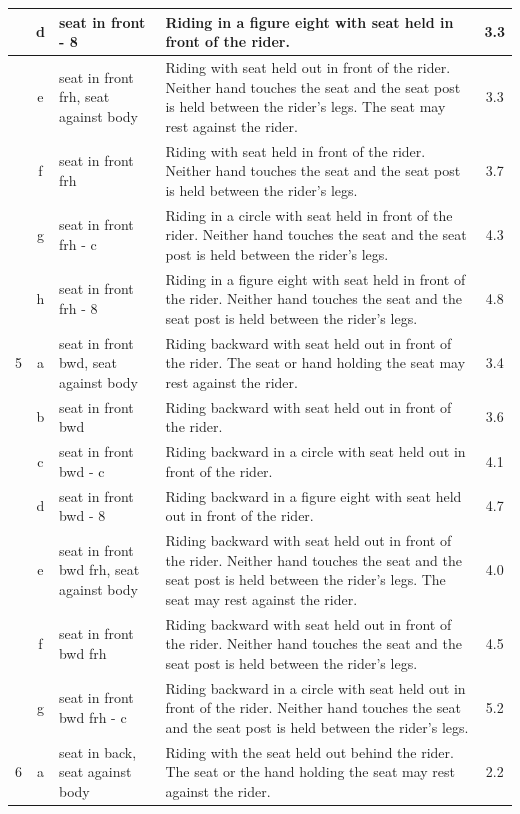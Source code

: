 \begin{longtable}{|r|c|p{4cm}|p{8cm}|c|}
\hline
  & d & seat in front - 8 & Riding in a figure eight with seat held in front of the rider.  & 3.3 \\ 
\hline
  & e & seat in front frh, seat against body  & Riding with seat held out in front of the rider. Neither hand touches the seat and the seat post is held between the rider's legs. The seat may rest against the rider. & 3.3 \\ 
\hline
  & f & seat in front frh & Riding with seat held in front of the rider. Neither hand touches the seat and the seat post is held between the rider's legs.  & 3.7 \\ 
\hline
  & g & seat in front frh - c & Riding in a circle with seat held in front of the rider. Neither hand touches the seat and the seat post is held between the rider's legs.  & 4.3 \\ 
\hline
  & h & seat in front frh - 8 & Riding in a figure eight with seat held in front of the rider. Neither hand touches the seat and the seat post is held between the rider's legs.  & 4.8 \\ 
\hline
5 & a & seat in front bwd, seat against body  & Riding backward with seat held out in front of the rider. The seat or hand holding the seat may rest against the rider. & 3.4 \\ 
\hline
  & b & seat in front bwd & Riding backward with seat held out in front of the rider. & 3.6 \\ 
\hline
  & c & seat in front bwd - c & Riding backward in a circle with seat held out in front of the rider. & 4.1 \\ 
\hline
  & d & seat in front bwd - 8 & Riding backward in a figure eight with seat held out in front of the rider. & 4.7 \\ 
\hline
  & e & seat in front bwd frh, seat against body  & Riding backward with seat held out in front of the rider. Neither hand touches the seat and the seat post is held between the rider's legs. The seat may rest against the rider.  & 4.0 \\ 
\hline
  & f & seat in front bwd frh & Riding backward with seat held out in front of the rider. Neither hand touches the seat and the seat post is held between the rider's legs. & 4.5 \\ 
\hline
  & g & seat in front bwd frh - c & Riding backward in a circle with seat held out in front of the rider. Neither hand touches the seat and the seat post is held between the rider's legs. & 5.2 \\ 
\hline
6 & a & seat in back, seat against body & Riding with the seat held out behind the rider. The seat or the hand holding the seat may rest against the rider. & 2.2 \\ 

\end{longtable}

